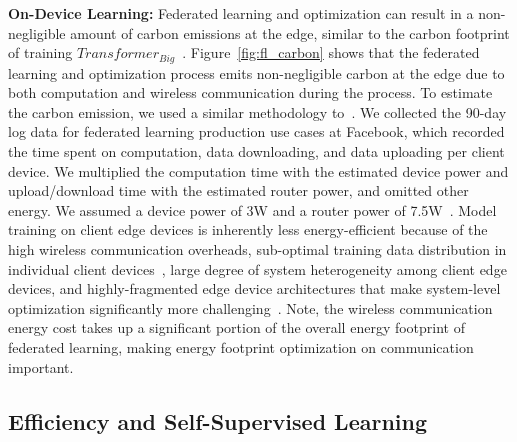 \documentclass{IEEEtran}
\newcommand{\fb}{Facebook}
\begin{document}
\textbf{On-Device Learning:} 
Federated learning and optimization can result in a non-negligible amount of carbon emissions at the edge, similar to the carbon footprint of training $Transformer_{Big}$~\cite{Patterson:arxiv:2021}.
Figure~\ref{fig:fl_carbon} shows that the federated learning and optimization process emits non-negligible carbon at the edge due to both computation and wireless communication during the process. 
To estimate the carbon emission, we used a similar methodology to~\cite{flcarbon}. We collected the 90-day log data for federated learning production use cases at \fb, which recorded the time spent on computation, data downloading, and data uploading per client device. We multiplied the computation time with the estimated device power and upload/download time with the estimated router power, and omitted other energy. We assumed a device power of 3W and a router power of 7.5W~\cite{phone_ml_energy, flcarbon}.
Model training on client edge devices is inherently less energy-efficient because of the high wireless communication overheads, sub-optimal training data distribution in individual client devices~\cite{flcarbon}, large degree of system heterogeneity among client edge devices, and highly-fragmented edge device architectures that make system-level optimization significantly more challenging~\cite{wu:hpca:2019}. Note, the wireless communication energy cost takes up a significant portion of the overall energy footprint of federated learning, making energy footprint optimization on communication important.


\subsection{Efficiency and Self-Supervised Learning}
\label{sec:ssl}

\end{document}

